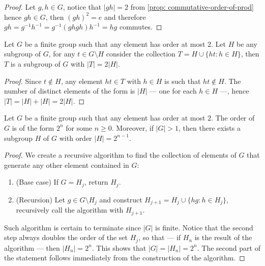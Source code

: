 \begin{proof}
  Let \(g, h \in G\), notice that \(|gh| = 2\) from \cref{prop:
  commutative-order-of-prod} hence \(gh \in G\), then \((gh)^2 = e\) and
  therefore \(gh = g^{-1} h^{-1} = g^{-1}(ghgh)h^{-1} = hg\) commutes.
\end{proof}

\begin{lemma}
  Let \(G\) be a finite group such that any element has order at most \(2\). Let
  \(H\) be any subgroup of \(G\), for any \(t \in G \setminus H\) consider the
  collection \(T = H \cup \{h t : h \in H\}\), then \(T\) is a subgroup of \(G\)
  with \(|T| = 2|H|\).
\end{lemma}

\begin{proof}
  Since \(t \not\in H\), any element \(ht \in T\) with \(h \in H\) is such that
  \(ht \not\in H\). The number of distinct elements of the form is \(|H|\) ---
  one for each \(h \in H\) ---, hence \(|T| = |H| + |H| = 2|H|\).
\end{proof}

\begin{lemma}[Order \(2^n\)]\label{lem: order-2n}
  Let \(G\) be a finite group such that any element has order at most \(2\). The
  order of \(G\) is of the form \(2^n\) for some \(n \geq 0\). Moreover, if
  \(|G| > 1\), then there exists a subgroup \(H\) of \(G\) with order \(|H| =
  2^{n-1}\).
\end{lemma}

\begin{proof}
  We create a recursive algorithm to find the collection of elements of \(G\)
  that generate any other element contained in \(G\):
  \begin{enumerate}
    \item (Base case) If \(G = H_j\), return \(H_j\).
    \item (Recursion) Let \(g \in G \setminus H_j\) and construct \(H_{j + 1} =
      H_j \cup \{h g: h \in H_j\}\), recursively call the algorithm with \(H_{j
      + 1}\).
  \end{enumerate}
  Such algorithm is certain to terminate since \(|G|\) is finite. Notice that
  the second step always doubles the order of the set \(H_j\), so that --- if
  \(H_n\) is the result of the algorithm --- then \(|H_n| = 2^n\). This shows
  that \(|G| = |H_n| = 2^n\). The second part of the statement follows
  immediately from the construction of the algorithm.
\end{proof}

